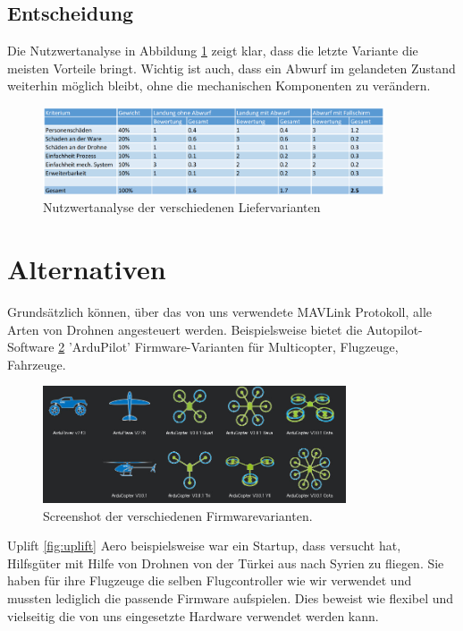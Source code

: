 \subsection{Entscheidung}

Die Nutzwertanalyse in Abbildung \ref{fig:nutzwertanalyse_abwurf} zeigt klar, dass die letzte Variante die meisten Vorteile bringt. Wichtig ist auch, dass ein Abwurf im gelandeten Zustand weiterhin möglich bleibt, ohne die mechanischen Komponenten zu verändern.

\begin{figure}[h]
	\centering
	\includegraphics[width=0.9\textwidth] {images/nutzwertanalyse_abwurf.png} 
	\caption{Nutzwertanalyse der verschiedenen Liefervarianten}
	\label{fig:nutzwertanalyse_abwurf}
\end{figure}

\section{Alternativen}

Grundsätzlich können, über das von uns verwendete \Gls{MAVLink} Protokoll, alle Arten von Drohnen angesteuert werden. Beispielsweise bietet die Autopilot-Software \ref{fig:arduScreenshot} 'ArduPilot' Firmware-Varianten für Multicopter, Flugzeuge, Fahrzeuge. \\
\begin{figure}[H]
\centering
\includegraphics[width=0.8\textwidth] {images/arduScreenshot.jpg}
\caption{Screenshot der verschiedenen Firmwarevarianten.}
\label{fig:arduScreenshot}
\end{figure}

Uplift \ref{fig:uplift} Aero beispielsweise war ein Startup, dass versucht hat, Hilfsgüter mit Hilfe von Drohnen von der Türkei aus nach Syrien zu fliegen. Sie haben für ihre Flugzeuge die selben Flugcontroller wie wir verwendet und mussten lediglich die passende Firmware aufspielen. Dies beweist wie flexibel und vielseitig die von uns eingesetzte Hardware verwendet werden kann.

